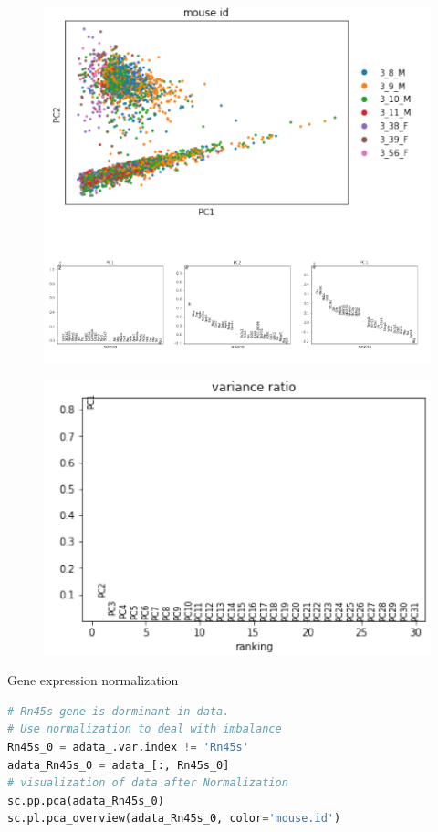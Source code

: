 \documentclass{article}
\begin{document}
  \begin{figure}
      \centering
      \includegraphics{6.png}
        \end{figure}
        \begin{figure}
      \centering
      \includegraphics{7.png}
        \end{figure}
        \newpage
    Gene expression normalization
    
    \begin{lstlisting}[language=python]
# Rn45s gene is dorminant in data.
# Use normalization to deal with imbalance
Rn45s_0 = adata_.var.index != 'Rn45s'
adata_Rn45s_0 = adata_[:, Rn45s_0]
# visualization of data after Normalization
sc.pp.pca(adata_Rn45s_0)
sc.pl.pca_overview(adata_Rn45s_0, color='mouse.id')
    \end{lstlisting}
    
\end{document}
